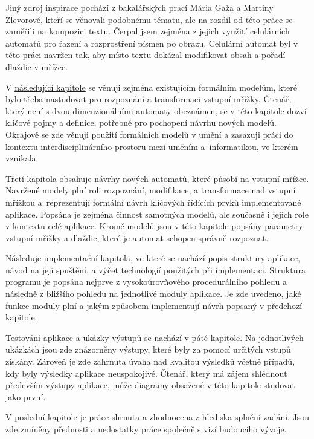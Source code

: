Jiný zdroj inspirace pochází z bakalářských prací Mária Gaža a Martiny Zlevorové, kteří se věnovali podobnému tématu, ale na rozdíl od této práce se zaměřili na kompozici textu. Čerpal jsem zejména z jejich využití celulárních automatů pro řazení a rozprostření písmen po obrazu. Celulární automat byl v této práci navržen tak, aby místo textu dokázal modifikovat obsah a pořadí dlaždic v mřížce.

V \hyperref[current]{následující kapitole} se věnuji zejména existujícím formálním modelům, které bylo třeba nastudovat pro rozpoznání a transformaci vstupní mřížky. Čtenář, který není s dvou-dimenzionálními automaty obeznámen, se v této kapitole dozví klíčové pojmy a definice, potřebné pro pochopení návrhu nových modelů. Okrajově se zde věnuji použití formálních modelů v umění a zasazuji práci do kontextu interdisciplinárního prostoru mezi uměním a~informatikou, ve kterém vznikala. 

\hyperref[newAutomata]{Třetí kapitola} obsahuje návrhy nových automatů, které působí na vstupní mřížce. Navržené modely plní roli rozpoznání, modifikace, a transformace nad vstupní mřížkou a~reprezentují formální návrh klíčových řídících prvků implementované aplikace. Popsána je zejména činnost samotných modelů, ale současně i jejich role v kontextu celé aplikace. Kromě modelů jsou v této kapitole popsány parametry vstupní mřížky a dlaždic, které je automat schopen správně rozpoznat.

Následuje \hyperref[impl]{implementační kapitola}, ve které se nachází popis struktury aplikace, návod na její spuštění, a výčet technologií použitých při implementaci. Struktura programu je popsána nejprve z vysokoúrovňového procedurálního pohledu a následně z bližšího pohledu na jednotlivé moduly aplikace. Je zde uvedeno, jaké funkce moduly plní a jakým způsobem implementují návrh popsaný v předchozí kapitole. 

Testování aplikace a ukázky výstupů se nachází v \hyperref[testing]{páté kapitole}. Na jednotlivých ukázkách jsou zde znázorněny výstupy, které byly za pomocí určitých vstupů získány. Zároveň je zde zahrnuta úvaha nad kvalitou výsledků včetně případů, kdy byly výsledky aplikace neuspokojivé. Čtenář, který má zájem shlédnout především výstupy aplikace, může diagramy obsažené v této kapitole studovat jako první.

V \hyperref[conclusion]{poslední kapitole} je práce shrnuta a zhodnocena z hlediska splnění zadání. Jsou zde zmíněny přednosti a nedostatky práce společně s vizí budoucího vývoje.


